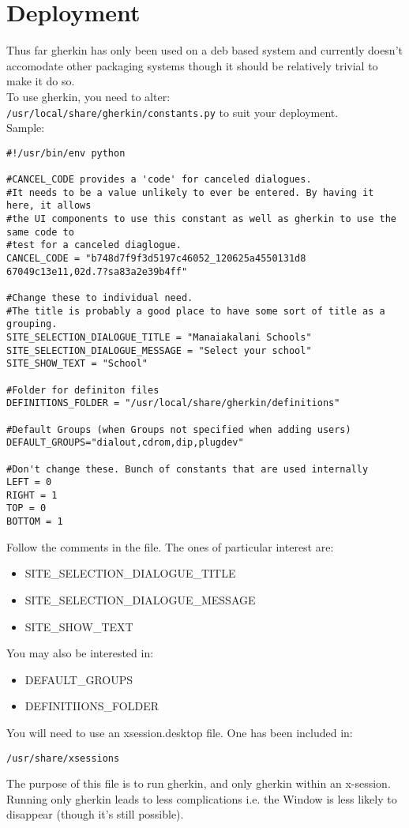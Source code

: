 \documentclass{article}
\begin{document}
\section{Deployment}
Thus far gherkin has only been used on a deb based system and currently
doesn't accomodate other packaging systems though it should be relatively
trivial to make it do so.\\
To use gherkin, you need to alter:\\
\texttt{/usr/local/share/gherkin/constants.py}
to suit your deployment.\\
Sample:
\begin{verbatim}
#!/usr/bin/env python

#CANCEL_CODE provides a 'code' for canceled dialogues.
#It needs to be a value unlikely to ever be entered. By having it here, it allows
#the UI components to use this constant as well as gherkin to use the same code to
#test for a canceled diaglogue.
CANCEL_CODE = "b748d7f9f3d5197c46052_120625a4550131d8 67049c13e11,02d.7?sa83a2e39b4ff"

#Change these to individual need.
#The title is probably a good place to have some sort of title as a grouping.
SITE_SELECTION_DIALOGUE_TITLE = "Manaiakalani Schools"
SITE_SELECTION_DIALOGUE_MESSAGE = "Select your school"
SITE_SHOW_TEXT = "School"

#Folder for definiton files
DEFINITIONS_FOLDER = "/usr/local/share/gherkin/definitions"

#Default Groups (when Groups not specified when adding users)
DEFAULT_GROUPS="dialout,cdrom,dip,plugdev"

#Don't change these. Bunch of constants that are used internally
LEFT = 0
RIGHT = 1
TOP = 0
BOTTOM = 1
\end{verbatim}
Follow the comments in the file. The ones of particular interest are:
\begin{itemize}
  \item SITE\_SELECTION\_DIALOGUE\_TITLE
  \item SITE\_SELECTION\_DIALOGUE\_MESSAGE
  \item SITE\_SHOW\_TEXT
\end{itemize}
You may also be interested in:
\begin{itemize}
  \item DEFAULT\_GROUPS
  \item DEFINITIIONS\_FOLDER
\end{itemize}
You will need to use an xsession.desktop file. One has been included in:
\begin{verbatim}
/usr/share/xsessions
\end{verbatim}
The purpose of this file is to run gherkin, and only gherkin within
an x-session. Running only gherkin leads to less complications i.e.
the Window is less likely to disappear (though it's still possible).
\end{document}
